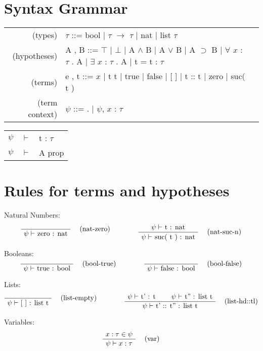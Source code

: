 \documentclass[twoside,a4paper]{article}
\begin{document}
\maketitle

\section{Syntax Grammar}
\begin{center}
\begin{tabular}{rll}
(types)& $\tau$ ::= bool 
| $\tau$ $\rightarrow$ $\tau $ | nat | list $\tau$
\\
(hypotheses)& A , B ::= $\top$ | $\bot$
| A $\wedge$ B | A $\vee$ B | A $\supset$ B 
| $\forall$ $x$ : $\tau$ . A | $\exists$ $x$ : $\tau$ . A
| t = t : $\tau$
\\
(terms)& e , t ::= $x$ | t t | true | false 
| [ ] | t :: t  %
| zero | suc( t ) %
\\
(term context)& $\psi$ ::= . | $\psi$, $x$ : $\tau$
\end{tabular}

\begin{tabular}{rll}
$\psi$ &$\vdash$ & t : $\tau$\\
$\psi$ &$\vdash$ & A prop
\end{tabular}
\end{center}

\section{Rules for terms and hypotheses}

Natural Numbers:
\[
\AxiomC{}
\RightLabel{\quad (nat-zero)}
\UnaryInfC{$\psi \vdash$ zero : nat}
\DisplayProof
\qquad
\qquad
\AxiomC{$\psi \vdash$ t : nat}
\RightLabel{\quad (nat-suc-n)}
\UnaryInfC{$\psi \vdash$ suc( t ) : nat}
\DisplayProof
\]

Booleans:
\[
\AxiomC{}
\RightLabel{\quad (bool-true)}
\UnaryInfC{$\psi \vdash$ true : bool}
\DisplayProof
\qquad
\qquad
\AxiomC{}
\RightLabel{\quad (bool-false)}
\UnaryInfC{$\psi \vdash$ false : bool}
\DisplayProof
\]

Lists:
\[
\AxiomC{}
\RightLabel{\quad (list-empty)}
\UnaryInfC{$\psi \vdash$ [ ] : list t}
\DisplayProof
\qquad
\qquad
\AxiomC{$\psi \vdash$ t' : t}
\AxiomC{$\psi \vdash$ t'' : list t}
\RightLabel{\quad (list-hd::tl)}
\BinaryInfC{$\psi \vdash$ t' :: t'' : list t}
\DisplayProof
\]

Variables:
\[
\AxiomC{$x : \tau \in \psi$}
\RightLabel{\quad (var)}
\UnaryInfC{$\psi \vdash x : \tau$}
\DisplayProof
\]
\end{document}
